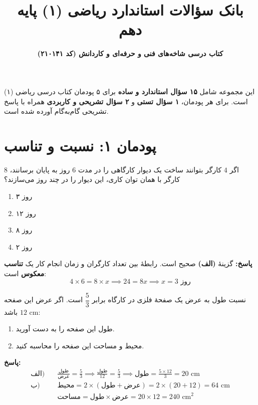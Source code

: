 \documentclass[a4paper,12pt]{article}
\title{\textbf{بانک سؤالات استاندارد ریاضی (۱) پایه دهم}}
\author{\textbf{کتاب درسی شاخه‌های فنی و حرفه‌ای و کاردانش (کد ۲۱۰۱۴۱)}}
\date{}
\begin{document}
\maketitle

\begin{tcolorbox}
این مجموعه شامل \textbf{۱۵ سؤال استاندارد و ساده} برای ۵ پودمان کتاب درسی ریاضی (۱) است. برای هر پودمان، \textbf{۱ سؤال تستی} و \textbf{۲ سؤال تشریحی و کاربردی} همراه با پاسخ تشریحی گام‌به‌گام آورده شده است.
\end{tcolorbox}

\vspace{0.4cm}

\section*{پودمان ۱: نسبت و تناسب}

\begin{tcolorbox}[title=\textbf{سؤال ۱ (تستی)}]
اگر $4$ کارگر بتوانند ساخت یک دیوار کارگاهی را در مدت $6$ روز به پایان برسانند، $8$ کارگر با همان توان کاری، این دیوار را در چند روز می‌سازند؟
\begin{enumerate}[label=\textbf{(\alph*)}]
    \item ۳ روز
    \item ۱۲ روز
    \item ۸ روز
    \item ۲ روز
\end{enumerate}
\textbf{پاسخ:} گزینۀ \textbf{(الف)} صحیح است. رابطۀ بین تعداد کارگران و زمان انجام کار یک \textbf{تناسب معکوس} است:
\[ 4 \times 6 = 8 \times x \implies 24 = 8x \implies x = 3 \text{ روز} \]
\end{tcolorbox}

\begin{tcolorbox}[title=\textbf{سؤال ۲ (تشریحی)}]
نسبت طول به عرض یک صفحۀ فلزی در کارگاه برابر $\dfrac{5}{3}$ است. اگر عرض این صفحه $12\text{ cm}$ باشد:
\begin{enumerate}[label=\textbf{\alph*)}]
    \item طول این صفحه را به دست آورید.
    \item محیط و مساحت این صفحه را محاسبه کنید.
\end{enumerate}
\textbf{پاسخ:}
\begin{align*}
\text{الف)} \quad & \frac{\text{طول}}{\text{عرض}} = \frac{5}{3} \implies \frac{\text{طول}}{12} = \frac{5}{3} \implies \text{طول} = \frac{5 \times 12}{3} = 20 \text{ cm} \\
\text{ب)} \quad & \text{محیط} = 2 \times (\text{طول} + \text{عرض}) = 2 \times (20 + 12) = 64 \text{ cm} \\
& \text{مساحت} = \text{طول} \times \text{عرض} = 20 \times 12 = 240 \text{ cm}^2
\end{align*}
\end{tcolorbox}
\end{document}
